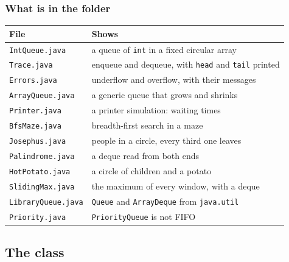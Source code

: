 \documentclass[aspectratio=169,10pt,compress]{beamer}
\begin{document}
\begin{frame}[t,fragile] \frametitle{What is in the folder}
  \begin{center}\small
  \begin{tabular}{@{}L{0.24\textwidth}L{0.62\textwidth}@{}}
    \toprule
    \textbf{File} & \textbf{Shows} \\
    \midrule
    \texttt{IntQueue.java}  & a queue of \texttt{int} in a fixed circular array \\
    \texttt{Trace.java}     & enqueue and dequeue, with \texttt{head} and \texttt{tail} printed \\
    \texttt{Errors.java}    & underflow and overflow, with their messages \\
    \texttt{ArrayQueue.java}& a generic queue that grows and shrinks \\
    \texttt{Printer.java}   & a printer simulation: waiting times \\
    \texttt{BfsMaze.java}   & breadth-first search in a maze \\
    \texttt{Josephus.java}  & people in a circle, every third one leaves \\
    \texttt{Palindrome.java}& a deque read from both ends \\
    \texttt{HotPotato.java} & a circle of children and a potato \\
    \texttt{SlidingMax.java}& the maximum of every window, with a deque \\
    \texttt{LibraryQueue.java} & \texttt{Queue} and \texttt{ArrayDeque} from \texttt{java.util} \\
    \texttt{Priority.java}  & \texttt{PriorityQueue} is not FIFO \\
    \bottomrule
  \end{tabular}
  \end{center}
\end{frame}


\subsection[Class]{The class}
\end{document}
